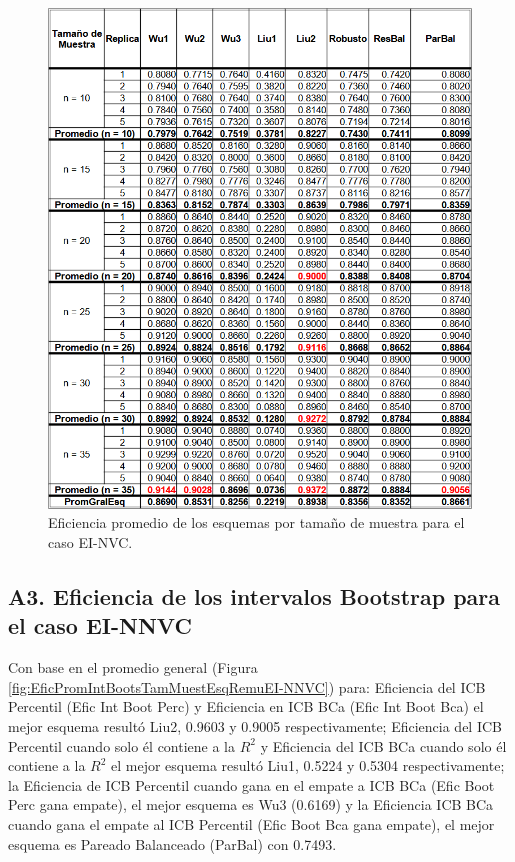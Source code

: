 \begin{figure}[ht] 
	\centering 
	\includegraphics[width=0.70\linewidth]{img/EI_NVC_Efic_Esq.png} 
	\caption{Eficiencia promedio de los esquemas por tamaño de muestra para el caso EI-NVC.} 
	\label{fig:EficPromEsqTamMuesEsqRemuEI-NVC}
\end{figure}
\FloatBarrier

\subsection*{A3. Eficiencia de los intervalos Bootstrap para el caso EI-NNVC}

Con base en el promedio general (Figura \ref{fig:EficPromIntBootsTamMuestEsqRemuEI-NNVC}) para: Eficiencia del ICB Percentil (Efic Int Boot Perc) y Eficiencia en ICB BCa (Efic Int Boot Bca) el mejor esquema resultó Liu2, 0.9603 y 0.9005 respectivamente;
Eficiencia del ICB Percentil cuando solo él contiene a la $R^{2}$ y Eficiencia del ICB BCa cuando solo él contiene a la $R^{2}$ el mejor esquema resultó Liu1, 0.5224 y 0.5304 respectivamente; la Eficiencia de ICB Percentil cuando gana en el empate a ICB BCa (Efic Boot Perc gana empate), el mejor esquema es Wu3 (0.6169) y la Eficiencia ICB BCa cuando gana el empate al ICB Percentil (Efic Boot Bca gana empate), el mejor esquema es Pareado Balanceado (ParBal) con 0.7493.\\


